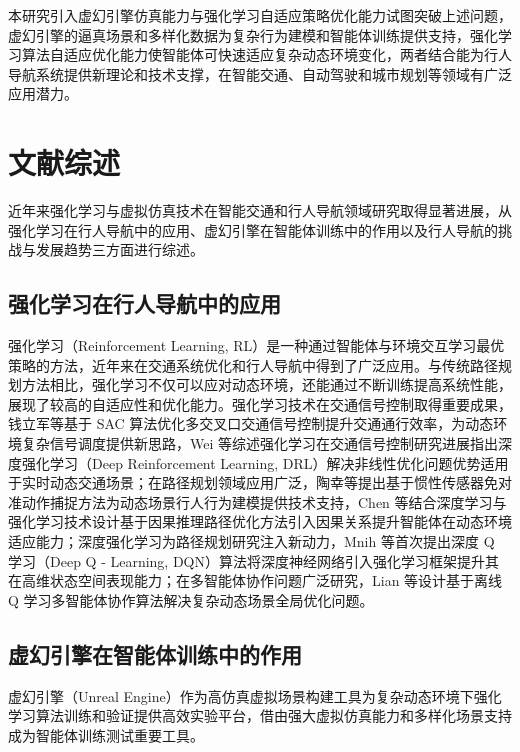 本研究引入虚幻引擎仿真能力与强化学习自适应策略优化能力试图突破上述问题，虚幻引擎的逼真场景和多样化数据为复杂行为建模和智能体训练提供支持，强化学习算法自适应优化能力使智能体可快速适应复杂动态环境变化，两者结合能为行人导航系统提供新理论和技术支撑，在智能交通、自动驾驶和城市规划等领域有广泛应用潜力。

\section{文献综述}

近年来强化学习与虚拟仿真技术在智能交通和行人导航领域研究取得显著进展，从强化学习在行人导航中的应用、虚幻引擎在智能体训练中的作用以及行人导航的挑战与发展趋势三方面进行综述。

\subsection{强化学习在行人导航中的应用}

强化学习（Reinforcement Learning, RL）是一种通过智能体与环境交互学习最优策略的方法，近年来在交通系统优化和行人导航中得到了广泛应用。与传统路径规划方法相比，强化学习不仅可以应对动态环境，还能通过不断训练提高系统性能，展现了较高的自适应性和优化能力。强化学习技术在交通信号控制取得重要成果，钱立军等\cite{qian2024sac}基于 SAC 算法优化多交叉口交通信号控制提升交通通行效率，为动态环境复杂信号调度提供新思路，Wei 等\cite{wei2021survey}综述强化学习在交通信号控制研究进展指出深度强化学习（Deep Reinforcement Learning, DRL）解决非线性优化问题优势适用于实时动态交通场景；在路径规划领域应用广泛，陶幸等\cite{tao2024motion}提出基于惯性传感器免对准动作捕捉方法为动态场景行人行为建模提供技术支持，Chen 等\cite{chen2018ionet}结合深度学习与强化学习技术设计基于因果推理路径优化方法引入因果关系提升智能体在动态环境适应能力；深度强化学习为路径规划研究注入新动力，Mnih 等\cite{mnih2013dqn}首次提出深度 Q 学习（Deep Q - Learning, DQN）算法将深度神经网络引入强化学习框架提升其在高维状态空间表现能力；在多智能体协作问题广泛研究，Lian 等\cite{lian2023inverseql}设计基于离线 Q 学习多智能体协作算法解决复杂动态场景全局优化问题。

\subsection{虚幻引擎在智能体训练中的作用}

虚幻引擎（Unreal Engine）作为高仿真虚拟场景构建工具为复杂动态环境下强化学习算法训练和验证提供高效实验平台，借由强大虚拟仿真能力和多样化场景支持成为智能体训练测试重要工具。

